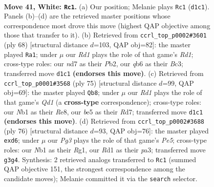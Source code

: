 \documentclass[11pt]{article}
\begin{document}
\clearpage

\begin{figure}[p]\centering
\begin{subfigure}{0.46\textwidth}\centering
\resizebox{\linewidth}{!}{%
\newchessgame
\chessboard[
  setfen={r4rk1/3n4/1q1p4/1P2bp1p/p6P/P1p1N1P1/R3Q3/1N1R2K1 w - - 0 41},
  showmover=false,
  pgfstyle=straightmove, color=movearrow, markmove={d1-c1}
]}
\caption{}
\end{subfigure}\hfill
\begin{subfigure}{0.46\textwidth}\centering
\resizebox{\linewidth}{!}{%
\newchessgame
\chessboard[
  setfen={5brk/1pp5/4rn1p/4pN1q/2P1P1p1/2BQ2RP/1P3Pp1/3R2K1 w - - 4 35},
  showmover=false,
  pgfstyle=straightmove, color=movearrow, markmove={d1-a1}
]}
\caption{}
\end{subfigure}
\\[4pt]
\begin{subfigure}{0.46\textwidth}\centering
\resizebox{\linewidth}{!}{%
\newchessgame
\chessboard[
  setfen={3qr3/3r3k/1p4pp/p1nPPp2/P7/1P5P/2Q1R1BK/5R2 b - - 0 38},
  showmover=false,
  pgfstyle=straightmove, color=movearrow, markmove={d8-b8}
]}
\caption{}
\end{subfigure}\hfill
\begin{subfigure}{0.46\textwidth}\centering
\resizebox{\linewidth}{!}{%
\newchessgame
\chessboard[
  setfen={4r2k/1r4p1/1q1pp3/3bP2p/3N1P2/pP2Q1R1/8/K5R1 w - - 1 39},
  showmover=false,
  pgfstyle=straightmove, color=movearrow, markmove={e5-d6}
]}
\caption{}
\end{subfigure}
\caption{\textbf{Move 41, White: \texttt{Rc1}.} (a) Our position; Melanie plays \texttt{Rc1} (\texttt{d1c1}). Panels (b)--(d) are the retrieved master positions whose correspondence most drove this move (highest QAP objective among those that transfer to it). (b) Retrieved from \texttt{ccrl\_top\_p0002\#3601} (ply 68) [structural distance $d$=103, QAP obj=82]: the master played \texttt{Ra1}; under $\mu$ our \emph{Rd1} plays the role of that game's \emph{Rd1}; cross-type roles: our \emph{n}d7 as their \emph{P}b2, our \emph{q}b6 as their \emph{B}c3; transferred move \texttt{d1c1} \textbf{(endorses this move)}. (c) Retrieved from \texttt{ccrl\_top\_p0001\#3568} (ply 75) [structural distance $d$=99, QAP obj=69]: the master played \texttt{Qb8}; under $\mu$ our \emph{Rd1} plays the role of that game's \emph{Qd1} (a \textbf{cross-type} correspondence); cross-type roles: our \emph{N}b1 as their \emph{R}e8, our \emph{b}e5 as their \emph{R}d7; transferred move \texttt{d1c1} \textbf{(endorses this move)}. (d) Retrieved from \texttt{ccrl\_top\_p0002\#3688} (ply 76) [structural distance $d$=93, QAP obj=76]: the master played \texttt{exd6}; under $\mu$ our \emph{Pg3} plays the role of that game's \emph{Pe5}; cross-type roles: our \emph{N}b1 as their \emph{R}g1, our \emph{R}d1 as their \emph{p}a3; transferred move \texttt{g3g4}. Synthesis: 2 retrieved analogs transferred to \texttt{Rc1} (summed QAP objective 151, the strongest correspondence among the candidate moves); Melanie committed it via the \texttt{search} selector.}
\label{fig:thought-m80}
\end{figure}
\end{document}
